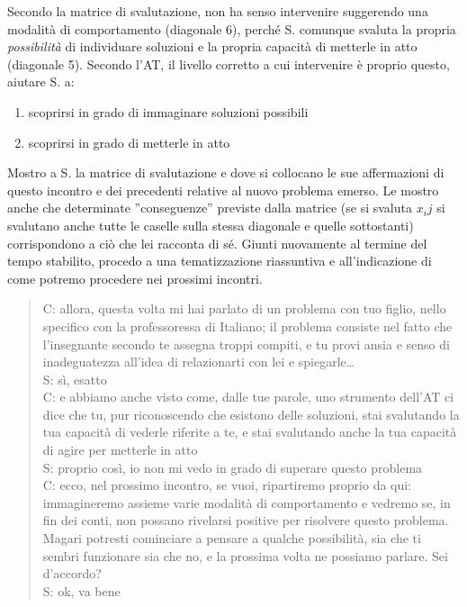 \noindent Secondo la matrice di svalutazione, non ha senso intervenire suggerendo una modalità di comportamento (diagonale 6), perché S. comunque svaluta la propria \emph{possibilità} di individuare soluzioni e la propria capacità di metterle in atto (diagonale 5). Secondo l'AT, il livello corretto a cui intervenire è proprio questo, aiutare S. a:

\begin{enumerate}
\item scoprirsi in grado di immaginare soluzioni possibili
\item scoprirsi in grado di metterle in atto
\end{enumerate}

\noindent Mostro a S. la matrice di svalutazione e dove si collocano le sue affermazioni di questo incontro e dei precedenti relative al nuovo problema emerso. Le mostro anche che determinate ''conseguenze'' previste dalla matrice (se si svaluta $x_ij$ si svalutano anche tutte le caselle sulla stessa diagonale e quelle sottostanti) corrispondono a ciò che lei racconta di sé. Giunti nuovamente al termine del tempo stabilito, procedo a una tematizzazione riassuntiva e all'indicazione di come potremo procedere nei prossimi incontri.

\begin{verse}
C: allora, questa volta mi hai parlato di un problema con tuo figlio, nello specifico con la professoressa di Italiano; il problema consiste nel fatto che l'insegnante secondo te assegna troppi compiti, e tu provi ansia e senso di inadeguatezza all'idea di relazionarti con lei e spiegarle\ldots\\
S: sì, esatto\\
C: e abbiamo anche visto come, dalle tue parole, uno strumento dell'AT ci dice che tu, pur riconoscendo che esistono delle soluzioni, stai svalutando la tua capacità di vederle riferite a te, e stai svalutando anche la tua capacità di agire per metterle in atto\\
S: proprio così, io non mi vedo in grado di superare questo problema\\
C: ecco, nel prossimo incontro, se vuoi, ripartiremo proprio da qui: immagineremo assieme varie modalità di comportamento e vedremo se, in fin dei conti, non possano rivelarsi positive per risolvere questo problema. Magari potresti cominciare a pensare a qualche possibilità, sia che ti sembri funzionare sia che no, e la prossima volta ne possiamo parlare. Sei d'accordo?\\
S: ok, va bene\\
\end{verse}

